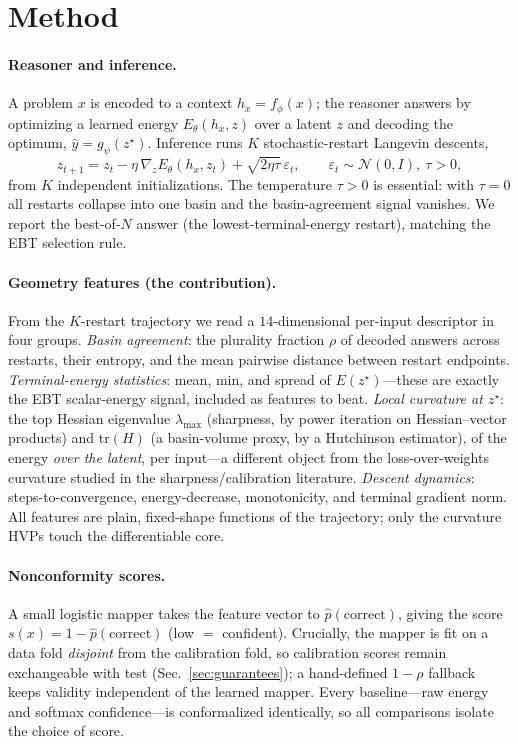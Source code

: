 \section{Method}
\label{sec:method}

\paragraph{Reasoner and inference.} A problem $x$ is encoded to a context $h_x = f_\phi(x)$; the
reasoner answers by optimizing a learned energy $E_\theta(h_x, z)$ over a latent $z$ and decoding the
optimum, $\hat y = g_\psi(z^\star)$. Inference runs $K$ stochastic-restart Langevin descents,
\[
  z_{t+1} = z_t - \eta\,\nabla_z E_\theta(h_x, z_t) + \sqrt{2\eta\tau}\,\varepsilon_t,\qquad
  \varepsilon_t \sim \mathcal N(0, I),\ \tau > 0,
\]
from $K$ independent initializations. The temperature $\tau>0$ is essential: with $\tau=0$ all
restarts collapse into one basin and the basin-agreement signal vanishes. We report the best-of-$N$
answer (the lowest-terminal-energy restart), matching the EBT selection rule.

\paragraph{Geometry features (the contribution).} From the $K$-restart trajectory we read a
$14$-dimensional per-input descriptor in four groups. \emph{Basin agreement}: the plurality fraction
$\rho$ of decoded answers across restarts, their entropy, and the mean pairwise distance between
restart endpoints. \emph{Terminal-energy statistics}: mean, min, and spread of $E(z^\star)$---these
are exactly the EBT scalar-energy signal, included as features to beat. \emph{Local curvature at
$z^\star$}: the top Hessian eigenvalue $\lambda_{\max}$ (sharpness, by power iteration on
Hessian--vector products) and $\mathrm{tr}(H)$ (a basin-volume proxy, by a Hutchinson estimator), of
the energy \emph{over the latent}, per input---a different object from the loss-over-weights
curvature studied in the sharpness/calibration literature. \emph{Descent dynamics}:
steps-to-convergence, energy-decrease, monotonicity, and terminal gradient norm. All features are
plain, fixed-shape functions of the trajectory; only the curvature HVPs touch the differentiable
core.

\paragraph{Nonconformity scores.} A small logistic mapper takes the feature vector to
$\hat p(\text{correct})$, giving the score $s(x) = 1 - \hat p(\text{correct})$ (low $=$ confident).
Crucially, the mapper is fit on a data fold \emph{disjoint} from the calibration fold, so
calibration scores remain exchangeable with test (Sec.~\ref{sec:guarantees}); a hand-defined
$1-\rho$ fallback keeps validity independent of the learned mapper. Every baseline---raw energy and
softmax confidence---is conformalized identically, so all comparisons isolate the choice of score.

